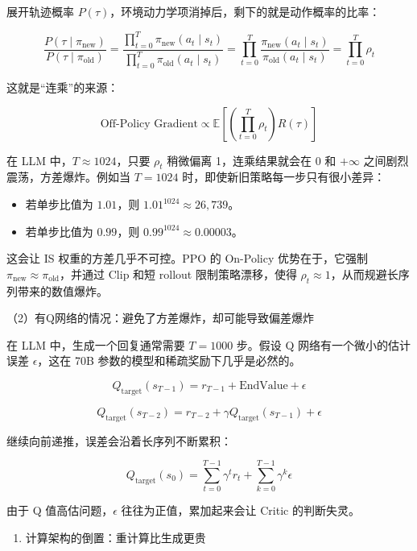 展开轨迹概率 \(P(\tau)\)，环境动力学项消掉后，剩下的就是动作概率的比率：

\[
\frac{P(\tau\mid\pi_{\mathrm{new}})}
{P(\tau\mid\pi_{\mathrm{old}})}
=
\frac{\prod_{t=0}^{T}\pi_{\mathrm{new}}(a_t\mid s_t)}
{\prod_{t=0}^{T}\pi_{\mathrm{old}}(a_t\mid s_t)}
=
\prod_{t=0}^{T}
\frac{\pi_{\mathrm{new}}(a_t\mid s_t)}
{\pi_{\mathrm{old}}(a_t\mid s_t)}
=
\prod_{t=0}^{T}\rho_t
\]

这就是``连乘''的来源：

\[
\text{Off-Policy Gradient}
\propto
\mathbb{E}
\left[
\left(\prod_{t=0}^{T}\rho_t\right)R(\tau)
\right]
\]

在 LLM 中，\(T\approx1024\)，只要 \(\rho_t\) 稍微偏离 1，连乘结果就会在 0 和 \(+\infty\) 之间剧烈震荡，方差爆炸。例如当 \(T=1024\) 时，即使新旧策略每一步只有很小差异：

\begin{itemize}
\tightlist
\item
  若单步比值为 \(1.01\)，则 \(1.01^{1024}\approx 26,739\)。
\item
  若单步比值为 \(0.99\)，则 \(0.99^{1024}\approx 0.00003\)。
\end{itemize}

这会让 IS 权重的方差几乎不可控。PPO 的 On-Policy 优势在于，它强制 \(\pi_{\mathrm{new}}\approx\pi_{\mathrm{old}}\)，并通过 Clip 和短 rollout 限制策略漂移，使得 \(\rho_t\approx1\)，从而规避长序列带来的数值爆炸。

（2）有Q网络的情况：避免了方差爆炸，却可能导致偏差爆炸

在 LLM 中，生成一个回复通常需要 \(T=1000\) 步。假设 Q 网络有一个微小的估计误差 \(\epsilon\)，这在 70B 参数的模型和稀疏奖励下几乎是必然的。

\[
Q_{\mathrm{target}}(s_{T-1})
=
r_{T-1}
+\mathrm{EndValue}
+\epsilon
\]

\[
Q_{\mathrm{target}}(s_{T-2})
=
r_{T-2}
+\gamma Q_{\mathrm{target}}(s_{T-1})
+\epsilon
\]

继续向前递推，误差会沿着长序列不断累积：

\[
Q_{\mathrm{target}}(s_0)
=
\sum_{t=0}^{T-1}\gamma^t r_t
+
\sum_{k=0}^{T-1}\gamma^k \epsilon
\]

由于 Q 值高估问题，\(\epsilon\) 往往为正值，累加起来会让 Critic 的判断失灵。

\begin{enumerate}
\def\labelenumi{\arabic{enumi}.}
\setcounter{enumi}{1}
\tightlist
\item
  计算架构的倒置：重计算比生成更贵
\end{enumerate}

